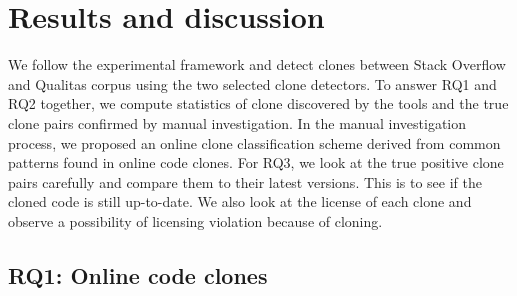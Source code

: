 \documentclass{sig-alternate-05-2015}
\begin{document}
\begin{table}
	\centering
	\caption{Configurations of Simian and NiCad}
	\label{t:param_tuning}
\end{table}

\section{Results and discussion}

We follow the experimental framework and detect clones between Stack Overflow and Qualitas corpus using the two selected clone detectors. To answer RQ1 and RQ2 together, we compute statistics of clone discovered by the tools and the true clone pairs confirmed by manual investigation. In the manual investigation process, we proposed an online clone classification scheme derived from common patterns found in online code clones. For RQ3, we look at the true positive clone pairs carefully and compare them to their latest versions. This is to see if the cloned code is still up-to-date. We also look at the license of each clone and observe a possibility of licensing violation because of cloning.
\subsection{RQ1: Online code clones} 
\end{document}
